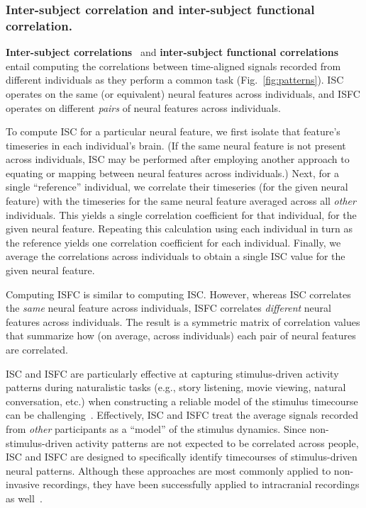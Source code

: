 \documentclass{llmxive}
\begin{document}
\subsubsection{Inter-subject correlation and inter-subject functional
  correlation.}
\textbf{Inter-subject correlations}~\citep[ISC;][]{HassEtal04} and
\textbf{inter-subject functional correlations}~\citep[ISFC;][]{SimoEtal16}
entail computing the correlations between time-aligned signals
recorded from different individuals as they perform a common task
(Fig.~\ref{fig:patterns}).  ISC operates on the same (or equivalent)
neural features across individuals, and ISFC operates on different
\textit{pairs} of neural features across individuals.

To compute ISC for a particular neural feature, we first isolate that
feature's timeseries in each individual's brain.  (If the same neural
feature is not present across individuals, ISC may be performed after
employing another approach to equating or mapping between neural
features across individuals.)  Next, for a single ``reference''
individual, we correlate their timeseries (for the given neural
feature) with the timeseries for the same neural feature averaged
across all \textit{other} individuals.  This yields a single
correlation coefficient for that individual, for the given neural
feature.  Repeating this calculation using each individual in turn
as the reference yields one correlation coefficient for each
individual.  Finally, we average the correlations across individuals
to obtain a single ISC value for the given neural feature.

Computing ISFC is similar to computing ISC.  However, whereas ISC
correlates the \textit{same} neural feature across individuals, ISFC
correlates \textit{different} neural features across individuals.  The
result is a symmetric matrix of correlation values that summarize how
(on average, across individuals) each pair of neural features are
correlated.

ISC and ISFC are particularly effective at capturing stimulus-driven
activity patterns during naturalistic tasks (e.g., story listening,
movie viewing, natural conversation, etc.) when constructing a
reliable model of the stimulus timecourse can be
challenging~\citep{SimoChan20}.  Effectively, ISC and ISFC treat the
average signals recorded from \textit{other} participants as a
``model'' of the stimulus dynamics.  Since non-stimulus-driven
activity patterns are not expected to be correlated across people, ISC
and ISFC are designed to specifically identify timecourses of
stimulus-driven neural patterns.  Although these approaches are most
commonly applied to non-invasive recordings, they have been
successfully applied to intracranial recordings as
well~\citep{MukaEtal05, HoneEtal12a, PoteEtal14, HaufEtal18}.
\end{document}
